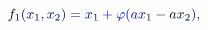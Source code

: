 \documentclass[12pt]{article}
\begin{document}
\makeatletter
\renewcommand*{\@textcolor}[3]{%
  \protect\leavevmode
  \begingroup
    \color#1{#2}#3%
  \endgroup
}
\makeatother
\begin{displaymath}
\mathcolor[RGB]{0,0,15}{f} _ { \mathcolor[RGB]{0,0,30}{1} } \mathcolor[RGB]{0,0,45}{(} \mathcolor[RGB]{0,0,60}{x} _ { \mathcolor[RGB]{0,0,75}{1} } \mathcolor[RGB]{0,0,90}{,} \mathcolor[RGB]{0,0,105}{x} _ { \mathcolor[RGB]{0,0,120}{2} } \mathcolor[RGB]{0,0,135}{)} \mathcolor[RGB]{0,0,150}{=} \mathcolor[RGB]{0,0,165}{x} _ { \mathcolor[RGB]{0,0,180}{1} } \mathcolor[RGB]{0,0,195}{+} \mathcolor[RGB]{0,0,210}{\varphi} \mathcolor[RGB]{0,0,225}{(} \mathcolor[RGB]{0,0,240}{a} \mathcolor[RGB]{0,0,255}{x} _ { \mathcolor[RGB]{0,15,0}{1} } \mathcolor[RGB]{0,15,15}{-} \mathcolor[RGB]{0,15,30}{a} \mathcolor[RGB]{0,15,45}{x} _ { \mathcolor[RGB]{0,15,60}{2} } \mathcolor[RGB]{0,15,75}{)} \mathcolor[RGB]{0,15,90}{,} \,
\end{displaymath}
\end{document}
